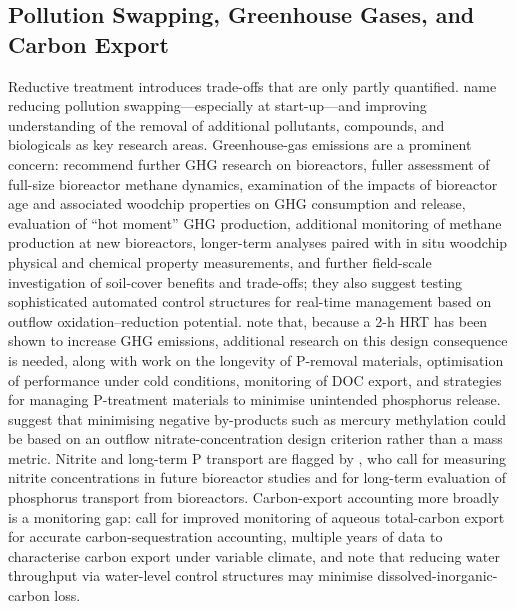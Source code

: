 \subsection{Pollution Swapping, Greenhouse Gases, and Carbon Export}
Reductive treatment introduces trade-offs that are only partly quantified. \textcite{Christianson2021} name reducing pollution swapping---especially at start-up---and improving understanding of the removal of additional pollutants, compounds, and biologicals as key research areas. Greenhouse-gas emissions are a prominent concern: \textcite{Brunton2024} recommend further GHG research on bioreactors, fuller assessment of full-size bioreactor methane dynamics, examination of the impacts of bioreactor age and associated woodchip properties on GHG consumption and release, evaluation of ``hot moment'' GHG production, additional monitoring of methane production at new bioreactors, longer-term analyses paired with in situ woodchip physical and chemical property measurements, and further field-scale investigation of soil-cover benefits and trade-offs; they also suggest testing sophisticated automated control structures for real-time management based on outflow oxidation--reduction potential. \textcite{Strock2025} note that, because a 2-h HRT has been shown to increase GHG emissions, additional research on this design consequence is needed, along with work on the longevity of P-removal materials, optimisation of performance under cold conditions, monitoring of DOC export, and strategies for managing P-treatment materials to minimise unintended phosphorus release. \textcite{Maxwell2022} suggest that minimising negative by-products such as mercury methylation could be based on an outflow nitrate-concentration design criterion rather than a mass metric. Nitrite and long-term P transport are flagged by \textcite{Bell2015}, who call for measuring nitrite concentrations in future bioreactor studies and for long-term evaluation of phosphorus transport from bioreactors. Carbon-export accounting more broadly is a monitoring gap: \textcite{Schilling2023} call for improved monitoring of aqueous total-carbon export for accurate carbon-sequestration accounting, multiple years of data to characterise carbon export under variable climate, and note that reducing water throughput via water-level control structures may minimise dissolved-inorganic-carbon loss.

